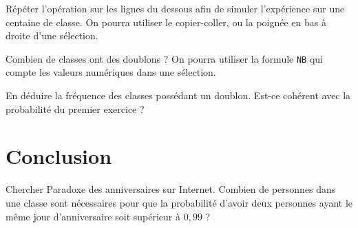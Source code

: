 \documentclass{exam}
\begin{document}
\begin{questions}
\question 
\begin{parts}
\item Répéter l'opération sur les lignes du dessous afin de simuler l'expérience sur une centaine de classe. On pourra utiliser le copier-coller, ou la poignée en bas à droite d'une sélection.

\item Combien de classes ont des doublons ? On pourra utiliser la formule \verb|NB| qui compte les valeurs numériques dans une sélection.

\item En déduire la fréquence des classes possédant un doublon. Est-ce cohérent avec la probabilité du premier exercice ? 
\end{parts}
\section{Conclusion}
\question Chercher \og Paradoxe des anniversaires \fg sur Internet. Combien de personnes dans une classe sont nécessaires pour que la probabilité d'avoir deux personnes ayant le même jour d'anniversaire soit supérieur à $0,99$ ?  
\end{questions}
\end{document}
